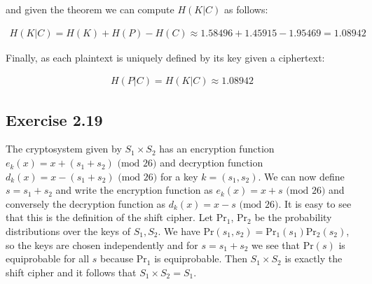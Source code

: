 \documentclass[12pt]{article}
\begin{document}
\noindent and given the theorem we can compute $H(K|C)$ as follows:

\begin{align*}
H(K|C) = H(K) + H(P) - H(C) \approx 1.58496 + 1.45915 - 1.95469 = 1.08942
\end{align*}
\smallskip

\noindent Finally, as each plaintext is uniquely defined by its key given a ciphertext:

\begin{align*}
H(P|C) = H(K|C) \approx 1.08942
\end{align*}

\subsection*{Exercise 2.19}

The cryptosystem given by $S_1 \times S_2$ has an encryption function $e_k(x) = x + (s_1 + s_2) \text{ (mod } 26)$ and decryption function $d_k(x) = x - (s_1 + s_2) \text{ (mod } 26)$ for a key $k = (s_1,s_2)$. We can now define $s = s_1 + s_2$ and write the encryption function as $e_k(x) = x + s \text{ (mod } 26)$ and conversely the decryption function as $d_k(x) = x - s \text{ (mod } 26)$. It is easy to see that this is the definition of the shift cipher. Let $\text{Pr}_1$, $\text{Pr}_2$ be the probability distributions over the keys of $S_1, S_2$. We have $\text{Pr}(s_1,s_2) = \text{Pr}_1(s_1) \text{Pr}_2(s_2)$, so the keys are chosen independently and for $s = s_1 + s_2$ we see that $\text{Pr}(s)$ is equiprobable for all $s$ because $\text{Pr}_1$ is equiprobable. Then $S_1 \times S_2$ is exactly the shift cipher and it follows that $S_1 \times S_2 = S_1$.
\end{document}
